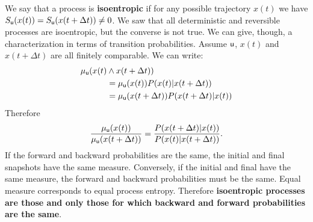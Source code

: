\documentclass[letterpaper]{article}
\begin{document}
We say that a process is \textbf{isoentropic} if for any possible trajectory $x(t)$ we have $S_{\stmt[u]}(x(t)) = S_{\stmt[u]}(x(t + \Delta t)) \neq 0$. We saw that all deterministic and reversible processes are isoentropic, but the converse is not true. We can give, though, a characterization in terms of transition probabilities. Assume $\stmt[u]$, $x(t)$ and $x(t+\Delta t)$ are all finitely comparable. We can write:
\begin{align*}
	\mu_{\stmt[u]}(x(t) &\AND x(t+\Delta t)) \\
	&=  \mu_{\stmt[u]}(x(t)) P(x(t)|x(t+\Delta t)) \\
	&=  \mu_{\stmt[u]}(x(t+\Delta t)) P(x(t+\Delta t)|x(t)) \\
\end{align*}
Therefore
\begin{equation}
\frac{\mu_{\stmt[u]}(x(t))}{\mu_{\stmt[u]}(x(t+\Delta t))} = \frac{P(x(t+\Delta t)|x(t))}{P(x(t)|x(t+\Delta t))}.
\end{equation}
If the forward and backward probabilities are the same, the initial and final snapshots have the same measure. Conversely, if the initial and final have the same measure, the forward and backward probabilities must be the same. Equal measure corresponds to equal process entropy. Therefore \textbf{isoentropic processes are those and only those for which backward and forward probabilities are the same}.


\end{document}
